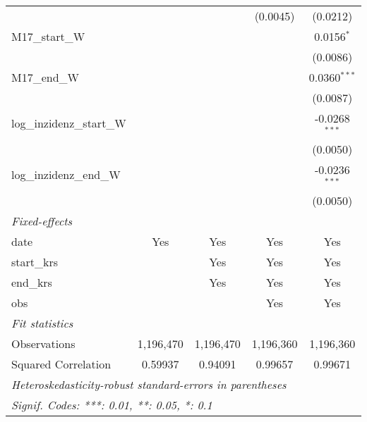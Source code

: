\documentclass[10pt,a4paper]{article}
\begin{document}
\begin{tabular}{lcccc}
                                                    &                 &                & (0.0045)        & (0.0212)\\   
   M17\_start\_W                                    &                 &                &                 & 0.0156$^{*}$\\   
                                                    &                 &                &                 & (0.0086)\\   
   M17\_end\_W                                      &                 &                &                 & 0.0360$^{***}$\\   
                                                    &                 &                &                 & (0.0087)\\   
   log\_inzidenz\_start\_W                          &                 &                &                 & -0.0268$^{***}$\\   
                                                    &                 &                &                 & (0.0050)\\   
   log\_inzidenz\_end\_W                            &                 &                &                 & -0.0236$^{***}$\\   
                                                    &                 &                &                 & (0.0050)\\   
   \midrule
   \emph{Fixed-effects}\\
   date                                             & Yes             & Yes            & Yes             & Yes\\  
   start\_krs                                       &                 & Yes            & Yes             & Yes\\  
   end\_krs                                         &                 & Yes            & Yes             & Yes\\  
   obs                                              &                 &                & Yes             & Yes\\  
   \midrule
   \emph{Fit statistics}\\
   Observations                                     & 1,196,470       & 1,196,470      & 1,196,360       & 1,196,360\\  
   Squared Correlation                              & 0.59937         & 0.94091        & 0.99657         & 0.99671\\  
   \midrule \midrule
   \multicolumn{5}{l}{\emph{Heteroskedasticity-robust standard-errors in parentheses}}\\
   \multicolumn{5}{l}{\emph{Signif. Codes: ***: 0.01, **: 0.05, *: 0.1}}\\
\end{tabular}
\par\endgroup
\end{document}
